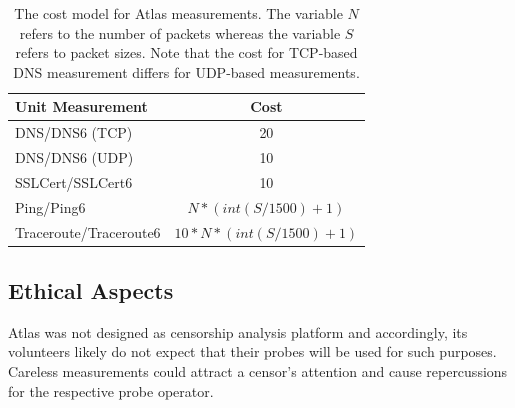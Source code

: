 %
%
%

% 

\begin{table}[ht!]
\centering
\begin{tabular}{lc}
\hline
\textbf{Unit Measurement} & \textbf{Cost} \\
\hline 
DNS\slash DNS6 (TCP) & 20\\ 
DNS\slash DNS6 (UDP) & 10\\ 
SSLCert\slash SSLCert6 & 10 \\
Ping\slash Ping6 & $N * (int(S/1500)+1)$\\
Traceroute\slash Traceroute6 & $ 10*N*(int(S/1500)+1)$\\[1ex] 
\hline 
\end{tabular} 
\caption{The cost model for Atlas measurements.  The variable $N$ refers to the
number of packets whereas the variable $S$ refers to packet sizes.  Note that
the cost for TCP-based DNS measurement differs for UDP-based measurements.}
\label{tab:cost} 
\end{table}

\subsection{Ethical Aspects}
Atlas was not designed as censorship analysis platform and accordingly, its
volunteers likely do not expect that their probes will be used for such
purposes.  Careless measurements could attract a censor's attention and cause
repercussions for the respective probe operator.

